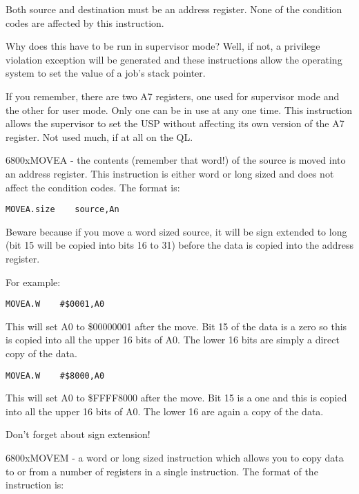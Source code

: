 Both source and destination must be an address register. None of the
    condition codes are affected by this instruction.

Why does this have to be run in supervisor mode? Well, if not, a
    privilege violation exception will be generated and these instructions
    allow the operating system to set the value of a job's stack
    pointer.

If you remember, there are two A7 registers, one used for supervisor
    mode and the other for user mode. Only one can be in use at any one time.
    This instruction allows the supervisor to set the USP without affecting
    its own version of the A7 register. Not used much, if at all on the
    QL.

\mc6800x{MOVEA} -{} the contents (remember that word!) of the source is moved
    into an address register. This instruction is either word or long sized
    and does not affect the condition codes. The format is:

\begin{lstlisting}[firstnumber=1,]
          MOVEA.size    source,An
\end{lstlisting}

Beware because if you move a word sized source, it will be sign
    extended to long (bit 15 will be copied into bits 16 to 31) before the
    data is copied into the address register.

For example:

\begin{lstlisting}[firstnumber=1,]
          MOVEA.W    #$0001,A0
\end{lstlisting}

This will set A0 to \$00000001 after the move. Bit 15 of the data is
    a zero so this is copied into all the upper 16 bits of A0. The lower 16
    bits are simply a direct copy of the data.

\begin{lstlisting}[firstnumber=1,]
          MOVEA.W    #$8000,A0
\end{lstlisting}

This will set A0 to \$FFFF8000 after the move. Bit 15 is a one and
    this is copied into all the upper 16 bits of A0. The lower 16 are again a
    copy of the data.

Don't forget about sign extension!

\mc6800x{MOVEM} -{} a word or long sized instruction which allows you to copy
    data to or from a number of registers in a single instruction. The format
    of the instruction is:

